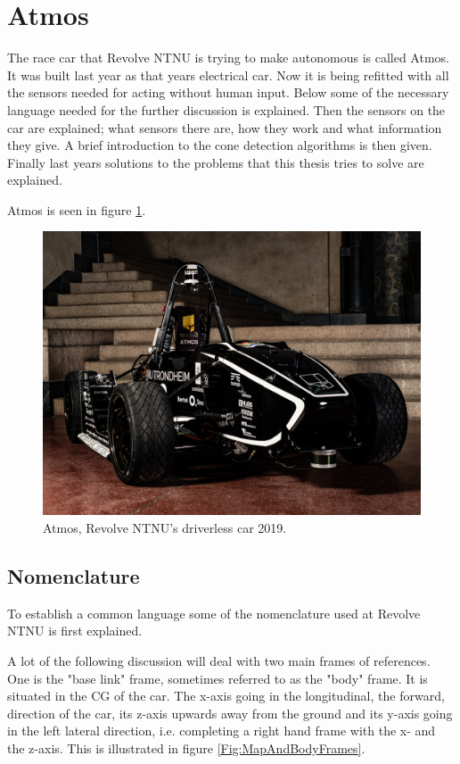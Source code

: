 \section{Atmos}

The race car that Revolve NTNU is trying to make autonomous is called Atmos. It was built last year as that years electrical car. Now it is being refitted with all the sensors needed for acting without human input. Below some of the necessary language needed for the further discussion is explained. Then the sensors on the car are explained; what sensors there are, how they work and what information they give. A brief introduction to the cone detection algorithms is then given. Finally last years solutions to the problems that this thesis tries to solve are explained.

Atmos is seen in figure \ref{Fig:Atmos}.

\begin{figure}
    \centering
    \includegraphics[width=\linewidth]{0_Images/2_Introduction/Atmos.jpg}
    \caption[Atmos.]{Atmos, Revolve NTNU's driverless car 2019.}
    \label{Fig:Atmos}
\end{figure}

\subsection{Nomenclature}

To establish a common language some of the nomenclature used at Revolve NTNU is first explained. 

A lot of the following discussion will deal with two main frames of references. One is the "base link" frame, sometimes referred to as the "body" frame. It is situated in the \gls{CG} of the car. The x-axis going in the longitudinal, the forward, direction of the car, its z-axis upwards away from the ground and its y-axis going in the left lateral direction, i.e. completing a right hand frame with the x- and the z-axis. This is illustrated in figure \ref{Fig:MapAndBodyFrames}. 

